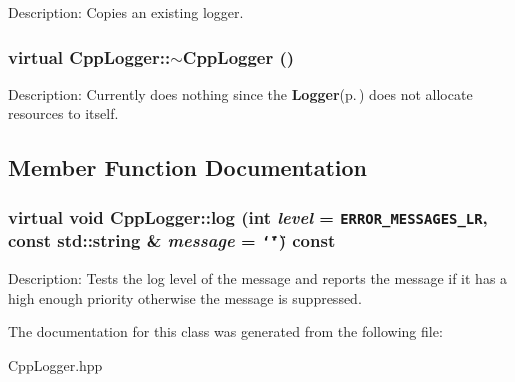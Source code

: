 Description: Copies an existing logger.
\subsubsection{\setlength{\rightskip}{0pt plus 5cm}virtual Cpp\-Logger::$\sim$Cpp\-Logger ()\hspace{0.3cm}{\tt  [inline, virtual]}}\label{classCppLogger_a2}


Description: Currently does nothing since the {\bf Logger}{\rm (p.\,\pageref{classLogger})} does not allocate resources to itself.

\subsection{Member Function Documentation}
\subsubsection{\setlength{\rightskip}{0pt plus 5cm}virtual void Cpp\-Logger::log (int {\em level} = {\tt ERROR\_\-MESSAGES\_\-LR}, const std::string \& {\em message} = {\tt \char`\"{}\char`\"{}}) const\hspace{0.3cm}{\tt  [virtual]}}\label{classCppLogger_a3}


Description: Tests the log level of the message and reports the message if it has a high enough priority otherwise the message is suppressed.

The documentation for this class was generated from the following file:\begin{CompactItemize}
\item 
Cpp\-Logger.hpp\end{CompactItemize}
